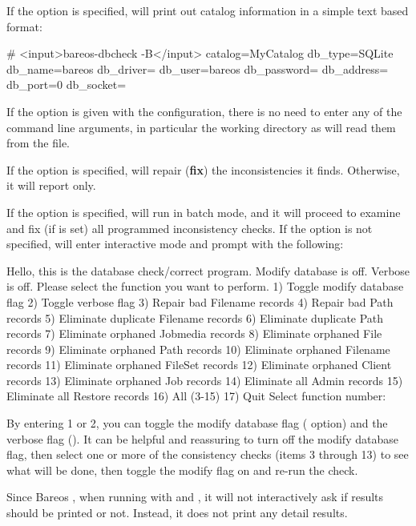 If the  option is specified,  will print out catalog
information in a simple text based format:
\begin{commands}{}
# <input>bareos-dbcheck -B</input>
catalog=MyCatalog
db_type=SQLite
db_name=bareos
db_driver=
db_user=bareos
db_password=
db_address=
db_port=0
db_socket=
\end{commands}

If the  option is given with the \bareosDir configuration, there is no
need to enter any of the command line arguments, in particular the working
directory as  will read them from the file.

If the  option is specified,  will repair ({\bf fix}) the
inconsistencies it finds. Otherwise, it will report only.

If the  option is specified,  will run in batch mode, and
it will proceed to examine and fix (if  is set) all programmed inconsistency
checks. If the  option is not specified,  will enter
interactive mode and prompt with the following:

\begin{commands}{}
Hello, this is the database check/correct program.
Modify database is off. Verbose is off.
Please select the function you want to perform.
     1) Toggle modify database flag
     2) Toggle verbose flag
     3) Repair bad Filename records
     4) Repair bad Path records
     5) Eliminate duplicate Filename records
     6) Eliminate duplicate Path records
     7) Eliminate orphaned Jobmedia records
     8) Eliminate orphaned File records
     9) Eliminate orphaned Path records
    10) Eliminate orphaned Filename records
    11) Eliminate orphaned FileSet records
    12) Eliminate orphaned Client records
    13) Eliminate orphaned Job records
    14) Eliminate all Admin records
    15) Eliminate all Restore records
    16) All (3-15)
    17) Quit
Select function number:
\end{commands}

By entering 1 or 2, you can toggle the modify database flag ( option) and
the verbose flag (). It can be helpful and reassuring to turn off the modify
database flag, then select one or more of the consistency checks (items 3
through 13) to see what will be done, then toggle the modify flag on and re-run
the check.

Since Bareos , when running 
with  and , it will not interactively ask if results should be
printed or not. Instead, it does not print any detail results.

